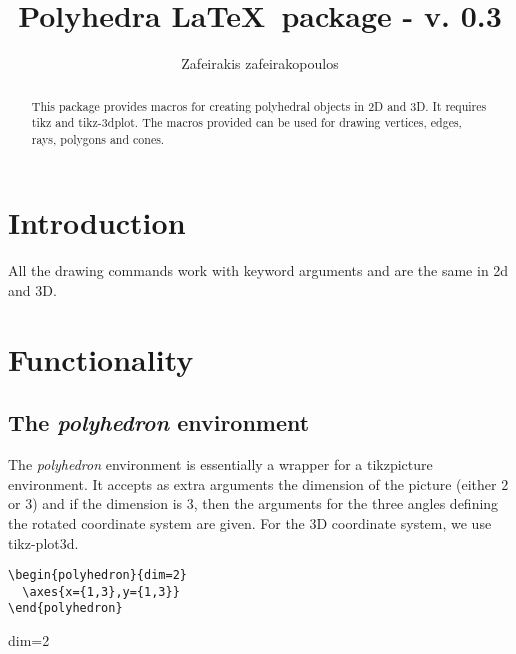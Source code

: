 \documentclass[a4paper]{article}
\begin{document}



\title{Polyhedra \LaTeX\ package - v. 0.3}
\author{Zafeirakis zafeirakopoulos}
\maketitle
\begin{abstract}
This package provides macros for creating polyhedral objects in 2D and 3D.
It requires tikz and tikz-3dplot.
The macros provided can be used for drawing vertices, edges, rays, polygons and
cones.
\end{abstract}

\section{Introduction}


All the drawing commands work with keyword arguments and are the same in
2d and 3D.



\section{Functionality}

\subsection{The \emph{polyhedron} environment}

The \emph{polyhedron} environment is essentially a wrapper for a tikzpicture
environment.
It accepts as extra arguments the dimension of the picture (either $2$ or $3$)
and if the dimension is $3$, then the arguments for the three angles defining
the rotated coordinate system are given.
For the 3D coordinate system, we use tikz-plot3d.

\begin{center}
  \begin{minipage}{0.6\textwidth}
  \begin{lstlisting}
\begin{polyhedron}{dim=2}
  \axes{x={1,3},y={1,3}}
\end{polyhedron}
  \end{lstlisting}
  \end{minipage}
  \qquad\qquad
  \begin{minipage}{0.2\textwidth}
    \begin{polyhedron}{dim=2}
    \end{polyhedron}
  \end{minipage}
\end{center}
\end{document}
